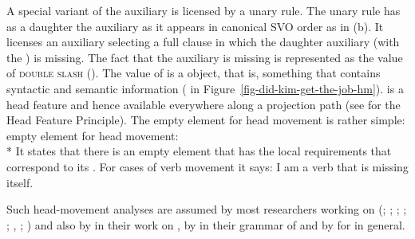 \documentclass[output=paper
	        ,collection
	        ,collectionchapter
 	        ,biblatex
                ,babelshorthands
                ,newtxmath
                ,draftmode
                ,colorlinks, citecolor=brown
]{langscibook}
\begin{document}
A special variant of the auxiliary is licensed by a unary rule. The unary rule has as a daughter the auxiliary as
it appears in canonical SVO order as in (b). It licenses an auxiliary selecting a full clause
in which the daughter auxiliary (with the \locv {}) is missing. The fact
that the auxiliary is missing is represented as the value of \textsc{double slash} (\dsl). The value of \dsl is a
 object, that is, something that contains syntactic and semantic information (
in Figure~\ref{fig-did-kim-get-the-job-hm}). \dsl is a head feature and hence available everywhere
along a projection path (see  for the Head Feature
Principle). The empty element for
head movement is rather simple:
\ea
empty element for head movement:\\*
\z
It states that there is an empty element that has the local requirements that correspond to its
\dslv. For cases of verb movement it says: I am a verb that is missing itself. 

Such head-movement analyses are assumed by most
researchers working on  (\citealp*[Section~4.7]{KW91a}; \citealp{Oliva92a}; \citealp*{Netter92};   
\citealp*{Frank94}; \citealp*[Section~2.2.4.2]{Kiss95a}; \citealp[Section~3.1.1.1]{Feldhaus97},
\citealp[Section~5.1]{Meurers2000b}; \citealp{Mueller2005c,MuellerGS}) and also by \citet[,
  71]{BvN98a} in their work on , by \citet{MOeDanish} in their grammar of
 and by \citet{MuellerGermanic} for  in general.
\end{document}
